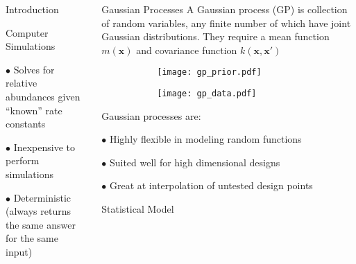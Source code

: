 \documentclass[final]{beamer}
\newcommand{\m}[1]{\mathbf{\bm{#1}}}
\begin{document}
\begin{frame}{}
\begin{columns}[t]
\begin{column}{.28\linewidth}
\begin{block}{Introduction}
    \begin{sc}Computer Simulations\end{sc}

    $\bullet$ Solves for relative abundances given ``known'' rate constants

    $\bullet$ Inexpensive to perform simulations

    $\bullet$ Deterministic (always returns the same answer for the same input)

    \end{block}
\end{column}

\begin{column}{.40\linewidth}
    \begin{block}{Gaussian Processes}
    A Gaussian process (GP) is collection of random variables, any finite number of which have joint Gaussian distributions. They require a mean function $m(\m{x})$ and covariance function $k(\m{x},\m{x}')$

    \bigskip
    \bigskip
    \bigskip
    \bigskip
    \begin{figure}
        \begin{subfigure}{0.40\textwidth}
            \centering
            \texttt{[image: gp\_prior.pdf]}
        \end{subfigure}%
        \begin{subfigure}{0.40\textwidth}
            \centering
            \texttt{[image: gp\_data.pdf]}
        \end{subfigure}
    \end{figure}
    \bigskip
    \bigskip
    \bigskip
    \bigskip

    Gaussian processes are:

    $\bullet$ Highly flexible in modeling random functions

    $\bullet$ Suited well for high dimensional designs

    $\bullet$ Great at interpolation of untested design points

    \end{block}


    \begin{block}{Statistical Model}


\end{block}
\end{column}
\end{columns}
\end{frame}
\end{document}
